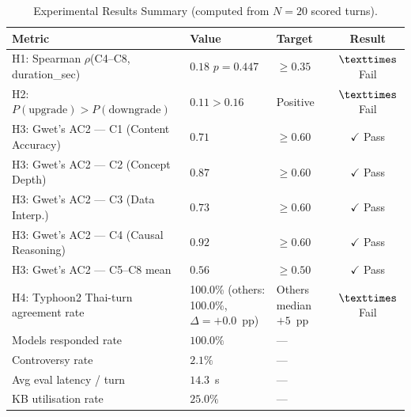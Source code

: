 \begin{table}[H]
\centering
\caption{Experimental Results Summary (computed from $N=20$ scored turns).}
\label{tab:results-computed}
\scriptsize
\begin{tabularx}{\columnwidth}{@{}Xllc@{}}
\toprule
\textbf{Metric} & \textbf{Value} & \textbf{Target} & \textbf{Result} \\
\midrule
H1: Spearman $\rho$(C4--C8, duration\_sec) & $0.18$ $p = 0.447$ & $\geq 0.35$ & $\texttimes$ Fail \\
H2: $P(\text{upgrade}) > P(\text{downgrade})$ & $0.11 > 0.16$ & Positive & $\texttimes$ Fail \\
H3: Gwet's AC2 — C1 (Content Accuracy) & $0.71$ & $\geq 0.60$ & $\checkmark$ Pass \\
H3: Gwet's AC2 — C2 (Concept Depth) & $0.87$ & $\geq 0.60$ & $\checkmark$ Pass \\
H3: Gwet's AC2 — C3 (Data Interp.) & $0.73$ & $\geq 0.60$ & $\checkmark$ Pass \\
H3: Gwet's AC2 — C4 (Causal Reasoning) & $0.92$ & $\geq 0.60$ & $\checkmark$ Pass \\
H3: Gwet's AC2 — C5--C8 mean & $0.56$ & $\geq 0.50$ & $\checkmark$ Pass \\
H4: Typhoon2 Thai-turn agreement rate & 100.0\% (others: 100.0\%, $\Delta = +0.0$~pp) & Others median $+5$~pp & $\texttimes$ Fail \\
Models responded rate & $100.0\%$ & --- &  \\
Controversy rate & $2.1\%$ & --- &  \\
Avg eval latency / turn & $14.3$~s & --- &  \\
KB utilisation rate & $25.0\%$ & --- &  \\
\bottomrule
\end{tabularx}
\end{table}